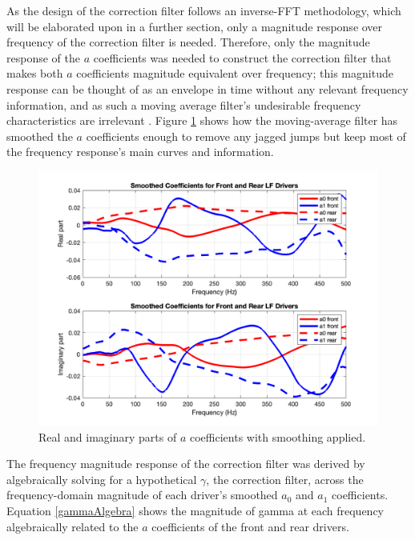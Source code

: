 \documentclass{report}
\begin{document}
            As the design of the correction filter follows an inverse-FFT methodology, which will be elaborated upon in a further section, only a magnitude response over frequency of the correction filter is needed.
            Therefore, only the magnitude response of the $a$ coefficients was needed to construct the correction filter that makes both $a$ coefficients magnitude equivalent over frequency; this magnitude response can be thought of as an envelope in time without any relevant frequency information, and as such a moving average filter's undesirable frequency characteristics are irrelevant \cite{smith2013digital}.
            Figure \ref{acoeffsSmooth} shows how the moving-average filter has smoothed the $a$ coefficients enough to remove any jagged jumps but keep most of the frequency response's main curves and information.

            \begin{figure}[H]
                \centering
                \includegraphics[scale=0.35]{figs/acoeffsSmooth.png}%
                \caption{Real and imaginary parts of $a$ coefficients with smoothing applied.}
                \label{acoeffsSmooth}
            \end{figure}

            The frequency magnitude response of the correction filter was derived by algebraically solving for a hypothetical $\gamma$, the correction filter, across the frequency-domain magnitude of each driver's smoothed $a_0$ and $a_1$ coefficients.
            Equation \ref{gammaAlgebra} shows the magnitude of gamma at each frequency algebraically related to the $a$ coefficients of the front and rear drivers.
\end{document}
